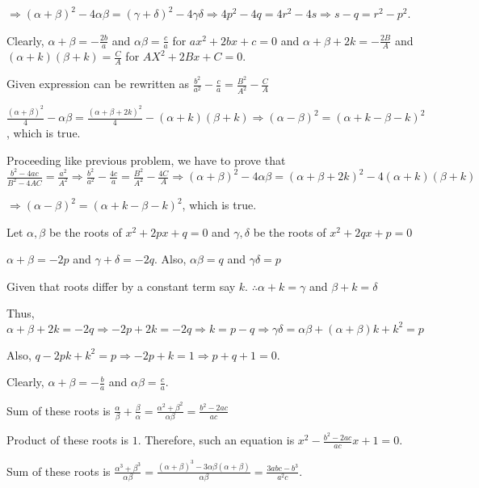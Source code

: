     $\Rightarrow (\alpha + \beta)^2 - 4\alpha\beta = (\gamma + \delta)^2 - 4\gamma\delta\Rightarrow 4p^2 -
    4q = 4r^2 - 4s \Rightarrow s - q = r^2 - p^2$.
  \stopitemize
\item Clearly, $\alpha + \beta = -\frac{2b}{a}$ and $\alpha\beta = \frac{c}{a}$ for $ax^2 + 2bx + c = 0$ and
  $\alpha + \beta + 2k = -\frac{2B}{A}$ and $(\alpha + k)(\beta + k) = \frac{C}{A}$ for $AX^2 + 2Bx + C = 0$.

  Given expression can be rewritten as $\frac{b^2}{a^2} - \frac{c}{a} = \frac{B^2}{A^2} - \frac{C}{A}$

  $\frac{(\alpha + \beta)^2}{4} - \alpha\beta = \frac{(\alpha + \beta + 2k)^2}{4} - (\alpha + k)(\beta +
  k)\Rightarrow (\alpha - \beta)^2 = (\alpha + k - \beta - k)^2$, which is true.
\item Proceeding like previous problem, we have to prove that $\frac{b^2 - 4ac}{B^2 - 4AC} = \frac{a^2}{A^2}
  \Rightarrow \frac{b^2}{a^2} - \frac{4c}{a} = \frac{B^2}{A^2} - \frac{4C}{A} \Rightarrow (\alpha + \beta)^2
  - 4\alpha\beta = (\alpha + \beta + 2k)^2 - 4(\alpha + k)(\beta + k)$

  $\Rightarrow (\alpha - \beta)^2 = (\alpha + k - \beta - k)^2$, which is true.
\item Let $\alpha, \beta$ be the roots of $x^2 + 2px + q = 0$ and $\gamma, \delta$ be the roots of
  $x^2 + 2qx + p = 0$

  $\alpha + \beta = -2p$ and $\gamma + \delta = -2q.$ Also, $\alpha\beta = q$ and
  $\gamma\delta = p$

  Given that roots differ by a constant term say $k$. $\therefore \alpha + k = \gamma$ and $\beta +
  k = \delta$

  Thus, $\alpha + \beta + 2k = -2q \Rightarrow -2p + 2k = -2q \Rightarrow k = p - q\Rightarrow
  \gamma\delta = \alpha\beta + (\alpha + \beta)k + k^2 = p$

  Also, $q - 2pk + k^2 = p \Rightarrow -2p + k = 1 \Rightarrow p + q + 1 = 0$.
\item Clearly, $\alpha + \beta = -\frac{b}{a}$ and $\alpha\beta = \frac{c}{a}$.
  \startitemize[i]
  \item Sum of these roots is $\frac{\alpha}{\beta} + \frac{\beta}{\alpha} = \frac{\alpha^2 +
    \beta^2}{\alpha\beta} = \frac{b^2 - 2ac}{ac}$

    Product of these roots is $1$. Therefore, such an equation is $x^2 -\frac{b^2 - 2ac}{ac}x + 1 = 0$.
  \item Sum of these roots is $\frac{\alpha^3 + \beta^3}{\alpha\beta} = \frac{(\alpha + \beta)^3 -
    3\alpha\beta(\alpha + \beta)}{\alpha\beta} = \frac{3abc - b^3}{a^2c}$.

